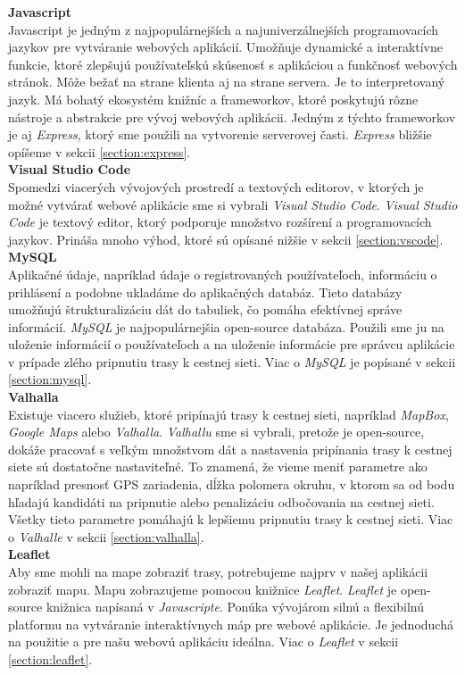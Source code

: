 \noindent\textbf{Javascript}\cite{javascript}\\
\indent Javascript je jedným z najpopulárnejších a najuniverzálnejších programovacích jazykov pre vytváranie webových aplikácií. Umožňuje dynamické a interaktívne funkcie, ktoré zlepšujú používateľskú skúsenosť s aplikáciou a funkčnosť webových stránok. Môže bežať na strane klienta aj na strane servera. Je to interpretovaný jazyk. Má bohatý ekosystém knižníc a frameworkov, ktoré poskytujú rôzne nástroje a abstrakcie pre vývoj webových aplikácii. Jedným z týchto frameworkov je aj \textit{Express}, ktorý sme použili na vytvorenie serverovej časti. \textit{Express} bližšie opíšeme v sekcii \ref{section:express}.\\

\noindent\textbf{Visual Studio Code}\\
\indent Spomedzi viacerých vývojových prostredí a textových editorov, v ktorých je možné vytvárať webové aplikácie sme si vybrali \textit{Visual Studio Code}. \textit{Visual Studio Code} je textový editor, ktorý podporuje množstvo rozšírení a programovacích jazykov. Prináša mnoho výhod, ktoré sú opísané nižšie v sekcii \ref{section:vscode}.\\

\noindent\textbf{MySQL}\\
\indent Aplikačné údaje, napríklad údaje o registrovaných používateľoch, informáciu o prihlásení a podobne ukladáme do aplikačných databáz. Tieto databázy umožňujú štrukturalizáciu dát do tabuliek, čo pomáha efektívnej správe informácií. \textit{MySQL} je najpopulárnejšia open-source databáza\cite{mysql}. Použili sme ju na uloženie informácií o používateľoch a na uloženie informácie pre správcu aplikácie v prípade zlého pripnutiu trasy k cestnej sieti. Viac o \textit{MySQL} je popísané v sekcii \ref{section:mysql}.\\

\noindent\textbf{Valhalla}\\
\indent Existuje viacero služieb, ktoré pripínajú trasy k cestnej sieti, napríklad \textit{MapBox}, \textit{Google Maps} alebo \textit{Valhalla}. \textit{Valhallu} sme si vybrali, pretože je open-source, dokáže pracovať s veľkým množstvom dát a nastavenia pripínania trasy k cestnej siete sú dostatočne nastaviteľné. To znamená, že vieme meniť parametre ako napríklad presnosť GPS zariadenia, dĺžka polomera okruhu, v ktorom sa od bodu hľadajú kandidáti na pripnutie alebo penalizáciu odbočovania na cestnej sieti. Všetky tieto parametre pomáhajú k lepšiemu pripnutiu trasy k cestnej sieti. Viac o \textit{Valhalle} v sekcii \ref{section:valhalla}.\\

\noindent\textbf{Leaflet}\\
\indent Aby sme mohli na mape zobraziť trasy, potrebujeme najprv v našej aplikácii zobraziť mapu. Mapu zobrazujeme pomocou knižnice \textit{Leaflet}. \textit{Leaflet} je open-source knižnica napísaná v \textit{Javascripte}. Ponúka vývojárom silnú a flexibilnú platformu na vytváranie interaktívnych máp pre webové aplikácie. Je jednoduchá na použitie a pre našu webovú aplikáciu ideálna. Viac o \textit{Leaflet} v sekcii \ref{section:leaflet}.